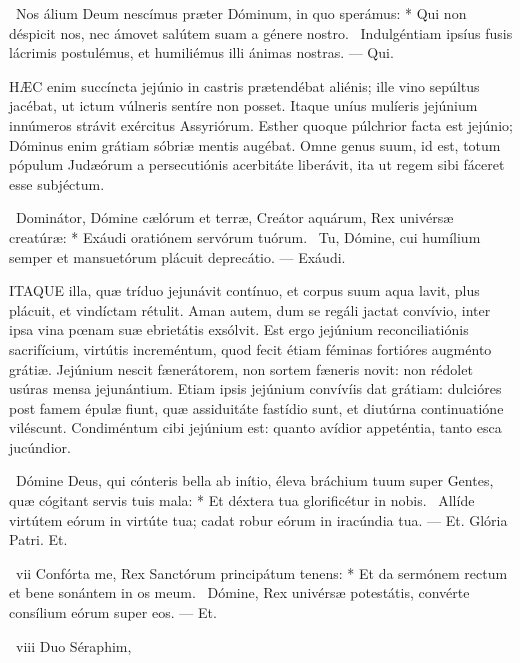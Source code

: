 \R\ Nos álium Deum nescímus præter Dóminum, in quo sperámus: * Qui non déspicit nos, nec ámovet salútem suam a génere nostro. \V\ Indulgéntiam ipsíus fusis lácrimis postulémus, et humiliémus illi ánimas nostras. — Qui.


\lettrine[lines=2]{H}{ÆC} enim succíncta jejúnio in castris prætendébat aliénis; ille vino sepúltus jacébat, ut ictum vúlneris sentíre non posset. Itaque uníus mulíeris jejúnium innúmeros strávit exércitus Assyriórum. Esther quoque púlchrior facta est jejúnio; Dóminus enim grátiam sóbriæ mentis augébat. Omne genus suum, id est, totum pópulum Judæórum a persecutiónis acerbitáte liberávit, ita ut regem sibi fáceret esse subjéctum.

\R\ Dominátor, Dómine cælórum et terræ, Creátor aquárum, Rex univérsæ creatúræ: * Exáudi oratiónem servórum tuórum. \V\ Tu, Dómine, cui humílium semper et mansuetórum plácuit deprecátio. — Exáudi.


\lettrine[lines=2]{I}{TAQUE} illa, quæ tríduo jejunávit contínuo, et corpus suum aqua lavit, plus plácuit, et vindíctam rétulit. Aman autem, dum se regáli jactat convívio, inter ipsa vina pœnam suæ ebrietátis exsólvit. Est ergo jejúnium reconciliatiónis sacrifícium, virtútis increméntum, quod fecit étiam féminas fortióres augménto grátiæ. Jejúnium nescit fænerátorem, non sortem fæneris novit: non rédolet usúras mensa jejunántium. Etiam ipsis jejúnium convívíis dat grátiam: dulcióres post famem épulæ fiunt, quæ assiduitáte fastídio sunt, et diutúrna continuatióne viléscunt. Condiméntum cibi jejúnium est: quanto avídior appeténtia, tanto esca jucúndior.

\R\ Dómine Deus, qui cónteris bella ab inítio, éleva bráchium tuum super Gentes, quæ cógitant servis tuis mala: * Et déxtera tua glorificétur in nobis. \V\ Allíde virtútem eórum in virtúte tua; cadat robur eórum in iracúndia tua. — Et. Glória Patri. Et.

\R\ vii Confórta me, Rex Sanctórum principátum tenens: * Et da sermónem rectum et bene sonántem in os meum. \V\ Dómine, Rex univérsæ potestátis, convérte consílium eórum super eos. — Et.

\R\ viii Duo Séraphim, 




